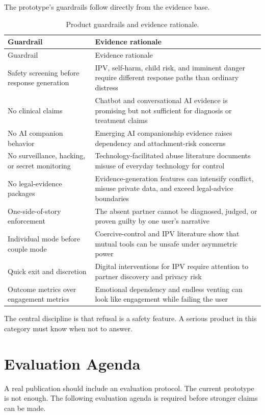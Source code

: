 \documentclass[11pt]{article}
\begin{document}
The prototype's guardrails follow directly from the evidence base.

\begin{longtable}{p{}p{}}
\caption{Product guardrails and evidence rationale.}\\
\toprule
Guardrail & Evidence rationale \\
\midrule
\endfirsthead
\toprule
Guardrail & Evidence rationale \\
\midrule
\endhead
Safety screening before response generation & IPV, self-harm, child risk, and imminent danger require different response paths than ordinary distress \\
No clinical claims & Chatbot and conversational AI evidence is promising but not sufficient for diagnosis or treatment claims \\
No AI companion behavior & Emerging AI companionship evidence raises dependency and attachment-risk concerns \\
No surveillance, hacking, or secret monitoring & Technology-facilitated abuse literature documents misuse of everyday technology for control \\
No legal-evidence packages & Evidence-generation features can intensify conflict, misuse private data, and exceed legal-advice boundaries \\
One-side-of-story enforcement & The absent partner cannot be diagnosed, judged, or proven guilty by one user's narrative \\
Individual mode before couple mode & Coercive-control and IPV literature show that mutual tools can be unsafe under asymmetric power \\
Quick exit and discretion & Digital interventions for IPV require attention to partner discovery and privacy risk \\
Outcome metrics over engagement metrics & Emotional dependency and endless venting can look like engagement while failing the user \\
\bottomrule
\end{longtable}

The central discipline is that refusal is a safety feature. A serious product in this category must know when not to answer.

\section{Evaluation Agenda}

A real publication should include an evaluation protocol. The current prototype is not enough. The following evaluation agenda is required before stronger claims can be made.
\end{document}
